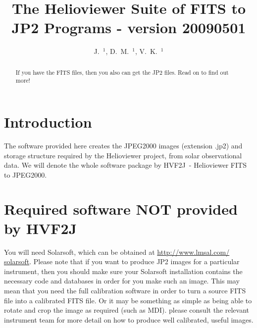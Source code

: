 \documentclass[namedreferences]{SolarPhysics}
\newcommand{\sname}{HVF2J}
\begin{document}
\begin{article}

\begin{opening}

\title{The Helioviewer Suite of FITS to JP2 Programs - version 20090501}

\author{J.~$^{1}$\sep
        D.~M.~$^{1}$\sep
        V.~K.~$^{1}$      
       }
\runningtitle{Helioviewer: FITS 2 JP2 - \sname}


\begin{abstract}
If you have the FITS files, then you also can get the JP2 files.  Read
on to find out more!
\end{abstract}
\end{opening}

\section{Introduction}
The software provided here creates the JPEG2000 images (extension .jp2)
and storage structure required by the Helioviewer project, from solar
observational data.  We will denote the whole software package by
\sname\ - Helioviewer FITS to JPEG2000.


\section{Required software NOT provided by \sname}\label{sec:req}

You will need Solarsoft, which can be obtained at
\url{http://www.lmsal.com/ solarsoft}.  Please note that if you want
to produce JP2 images for a particular instrument, then you should
make sure your Solarsoft installation contains the necessary code and
databases in order for you make such an image.  This may mean that you
need the full calibration software in order to turn a source FITS file
into a calibrated FITS file.  Or it may be something as simple as
being able to rotate and crop the image as required (such as MDI).
please consult the relevant instrument team for more detail on how to
produce well calibrated, useful images.


\end{article}
\end{document}
